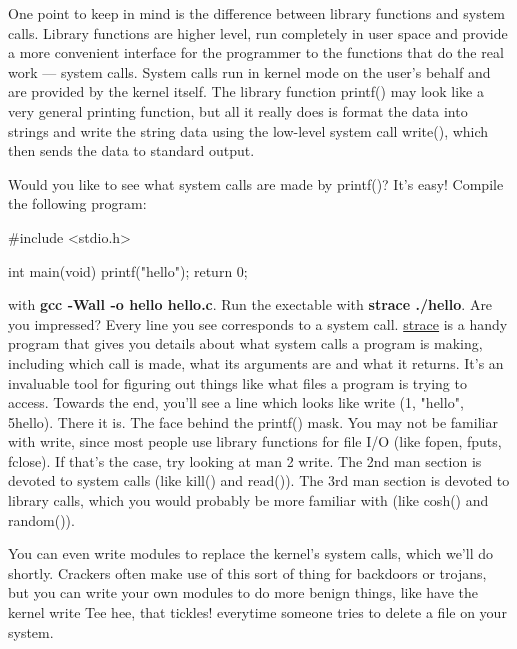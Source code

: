 \documentclass[10pt, oneside]{book}
\begin{document}
One point to keep in mind is the difference between library functions and system calls. Library functions are higher level, run completely in user space and provide a more convenient interface for the programmer to the functions that do the real work --- system calls. System calls run in kernel mode on the user's behalf and are provided by the kernel itself. The library function printf() may look like a very general printing function, but all it really does is format the data into strings and write the string data using the low-level system call write(), which then sends the data to standard output.

Would you like to see what system calls are made by printf()? It's easy! Compile the following program:

\begin{code}
#include <stdio.h>

int main(void)
{
    printf("hello");
    return 0;
}
\end{code}

with \textbf{gcc -Wall -o hello hello.c}. Run the exectable with \textbf{strace ./hello}. Are you impressed? Every line you see corresponds to a system call. \href{https://strace.io/}{strace} is a handy program that gives you details about what system calls a program is making, including which call is made, what its arguments are and what it returns. It's an invaluable tool for figuring out things like what files a program is trying to access. Towards the end, you'll see a line which looks like write (1, "hello", 5hello). There it is. The face behind the printf() mask. You may not be familiar with write, since most people use library functions for file I/O (like fopen, fputs, fclose). If that's the case, try looking at man 2 write. The 2nd man section is devoted to system calls (like kill() and read()). The 3rd man section is devoted to library calls, which you would probably be more familiar with (like cosh() and random()).

You can even write modules to replace the kernel's system calls, which we'll do shortly. Crackers often make use of this sort of thing for backdoors or trojans, but you can write your own modules to do more benign things, like have the kernel write Tee hee, that tickles! everytime someone tries to delete a file on your system.
\end{document}
